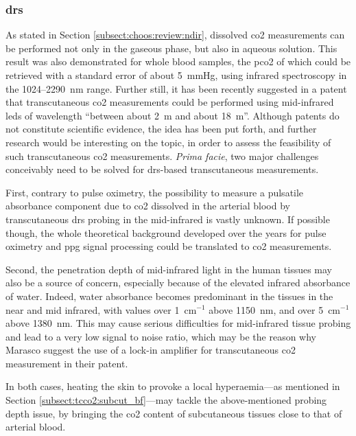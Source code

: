 \subsubsection{\texorpdfstring{\gls{drs}}{DRS}}\label{subsect:choos:pot:drs}

As stated in Section \ref{subsect:choos:review:ndir}, dissolved \gls{co2} measurements can be performed not only in the gaseous phase, but also in aqueous solution\cite{schaden2004}. This result was also demonstrated for whole blood samples, the \gls{pco2} of which could be retrieved with a standard error of about 5~mmHg, using infrared spectroscopy in the 1024--2290~nm range\cite{domjan1994}. Further still, it has been recently suggested in a patent that transcutaneous \gls{co2} measurements could be performed using mid-infrared \glspl{led} of wavelength \enquote{between about 2~\textmu{}m and about 18~\textmu{}m}\cite{marasco2020}. Although patents do not constitute scientific evidence\cite{freilich2019}, the idea has been put forth, and \mfrin{}further research would be interesting on the topic, in order to assess the feasibility of such transcutaneous \gls{co2} measurements. \emph{Prima facie}, two major challenges conceivably need to be solved for \gls{drs}-based transcutaneous measurements.

First, contrary to pulse oximetry, the possibility to measure a pulsatile absorbance component due to \gls{co2} dissolved in the arterial blood by transcutaneous \gls{drs} probing in the mid-infrared is vastly unknown. If possible though, the whole theoretical background developed over the years for pulse oximetry and \gls{ppg} signal processing\cite{tamura2019} could be translated to \gls{co2} measurements.

Second, the penetration depth of mid-infrared light in the human tissues may also be a source of concern, especially because of the elevated infrared absorbance of water. Indeed, water absorbance becomes predominant in the tissues in the near and mid infrared\cite{jacques2013}, with values over 1~cm$^{-1}$ above 1150~nm, and over 5~cm$^{-1}$ above 1380~nm\cite{kou1993}. This may cause serious difficulties for mid-infrared tissue probing and lead to a very low signal to noise ratio, which may be the reason why Marasco \etal{} suggest the use of a lock-in amplifier for transcutaneous \gls{co2} measurement in their patent\cite{marasco2020}.

In both cases, heating the skin to provoke a local hyperaemia---as mentioned in Section \ref{subsect:tcco2:subcut_bf}---may tackle the above-mentioned probing depth issue, by bringing the \gls{co2} content of subcutaneous tissues close to that of arterial blood.

